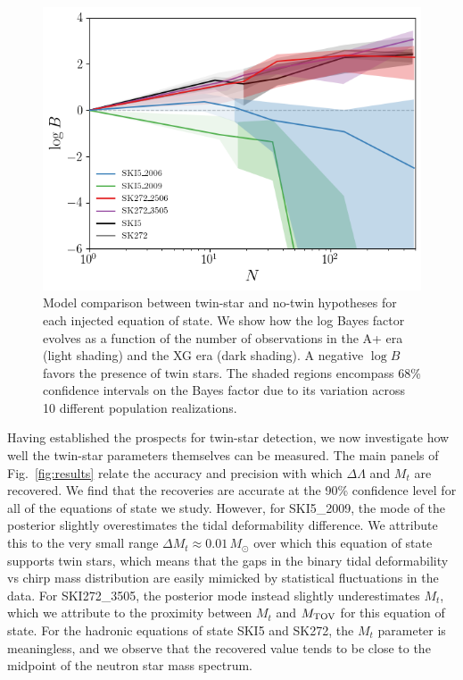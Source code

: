 \documentclass[aps,prd,twocolumn,superscriptaddress,nofootinbib]{revtex4-1}
\newcommand{\Msun}{\ensuremath{\,M_{\odot}}}
\begin{document}
\begin{figure}[t]
    \centering
    \includegraphics[width=0.95\columnwidth]{BFs.png}
    \caption{Model comparison between twin-star and no-twin hypotheses for each injected equation of state. We show how the log Bayes factor evolves as a function of the number of observations in the A+ era (light shading) and the XG era (dark shading). A negative $\log B$ favors the presence of twin stars. The shaded regions encompass 68\% confidence intervals on the Bayes factor due to its variation across 10 different population realizations.}
    \label{fig:bfs}
\end{figure}

Having established the prospects for twin-star detection, we now investigate how well the twin-star parameters themselves can be measured. The main panels of Fig.~\ref{fig:results} relate the accuracy and precision with which $\Delta\Lambda$ and $M_t$ are recovered. 
We find that the recoveries are accurate at the 90\% confidence level for all of the equations of state we study. However, for SKI5\_2009, the mode of the posterior slightly overestimates the tidal deformability difference. We attribute this to the very small range $\Delta M_t \approx 0.01\Msun$ over which this equation of state supports twin stars, which means that the gaps in the binary tidal deformability vs chirp mass distribution are easily mimicked by statistical fluctuations in the data. For SKI272\_3505, the posterior mode instead slightly underestimates $M_t$, which we attribute to the proximity between $M_t$ and $M_{\rm TOV}$ for this equation of state.  
For the hadronic equations of state SKI5 and SK272, the $M_t$ parameter is meaningless, and we observe that the recovered value tends to be close to the midpoint of the neutron star mass spectrum. 
\end{document}
